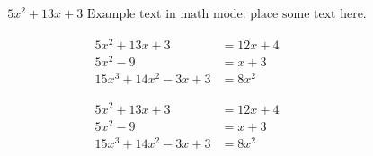 \documentclass[11pt]{article} %
\begin{document}
\begin{align} %
    5x^2 + 13x + 3 \, \, \text{Example text in math mode: place some text here.}
\end{align}

\begin{align} %
    5x^2 + 13x + 3 &= 12x + 4\\
    5x^2 - 9 &= x + 3\\ %
    15x^3 + 14x^2 - 3x + 3 &= 8x^2
\end{align}

\begin{align*} %
    5x^2 + 13x + 3 &= 12x + 4\\
    5x^2 - 9 &= x + 3\\ %
    15x^3 + 14x^2 - 3x + 3 &= 8x^2
\end{align*}
\end{document}

